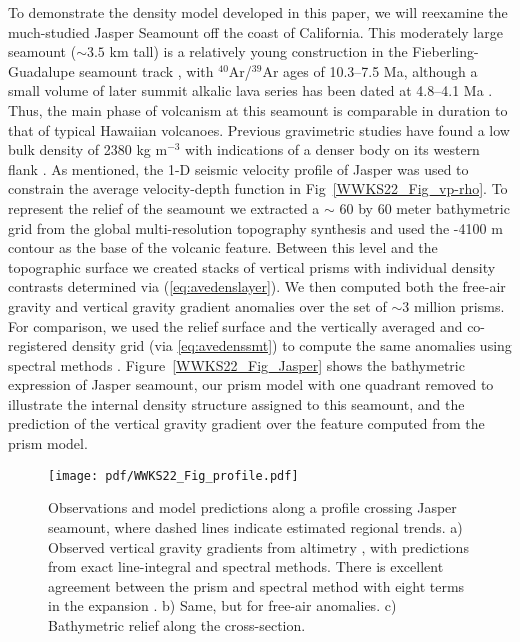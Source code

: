 To demonstrate the density model developed in this paper, we will reexamine the much-studied Jasper Seamount off
the coast of California. This moderately large seamount ($\sim 3.5$ km tall) is a relatively young construction
in the Fieberling-Guadalupe seamount track \citep{B1989}, with $^{40}$Ar/$^{39}$Ar ages of 10.3--7.5 Ma, although a
small volume of later summit alkalic lava series has been dated at 4.8--4.1 Ma \citep{PSG91}. Thus, the main phase
of volcanism at this seamount is comparable in duration to that of typical Hawaiian volcanoes.  Previous gravimetric
studies have found a low bulk density of 2380 kg m$^{-3}$ with indications of a denser body on its western flank
\citep{H1991}. As mentioned, the 1-D seismic velocity profile of Jasper \citep{H1994} was used to constrain the average
velocity-depth function in Fig~\ref{WWKS22_Fig_vp-rho}. To represent the relief of the seamount we extracted a
$\sim$ 60 by 60 meter bathymetric grid from the global multi-resolution topography synthesis \citep{R2009} and used
the -4100 m contour as the base of the volcanic feature.  Between this level and the topographic surface we created
stacks of vertical prisms with individual density contrasts determined via (\ref{eq:avedenslayer}).
We then computed both the free-air gravity and vertical gravity gradient anomalies over the set of $\sim 3$ million
prisms. For comparison, we used the relief surface and the vertically averaged and co-registered density grid
(via \ref{eq:avedenssmt}) to compute the same anomalies using spectral methods \citep{P1972}.
Figure~\ref{WWKS22_Fig_Jasper} shows the bathymetric expression of Jasper seamount, our prism model with one quadrant
removed to illustrate the internal density structure assigned to this seamount, and the prediction of the
vertical gravity gradient over the feature computed from the prism model.

\begin{figure}[h]
\centering
\texttt{[image: pdf/WWKS22\_Fig\_profile.pdf]}
\caption{Observations and model predictions along a profile crossing Jasper seamount, where dashed lines indicate
estimated regional trends. a) Observed vertical gravity gradients from altimetry \citep{Setal2021}, with predictions
from exact line-integral and spectral methods.  There is excellent agreement between the prism and spectral method
with eight terms in the expansion \citep{P1972}. b) Same, but for free-air anomalies. c) Bathymetric relief along the
cross-section.}
\label{WWKS22_Fig_profile}
\end{figure}

